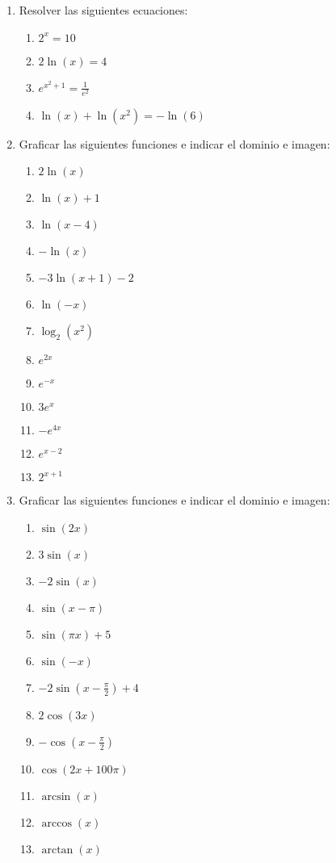 \documentclass[a4paper]{article}
\newcommand{\exercise}{\item}
\begin{document}
\begin{enumerate}
	\exercise Resolver las siguientes ecuaciones:
	\begin{enumerate} [label=(\alph*)]
		\item $2^x=10$
		\item $2\ln(x)=4$
		\item $e^{x^2+1}=\displaystyle{\frac{1}{e^2}}$
		\item $\ln(x)+\ln(x^2)=-\ln(6)$
	\end{enumerate}

	\exercise Graficar las siguientes funciones e indicar el dominio e imagen:
	\begin{multicols}{3}
	\begin{enumerate} [label=(\alph*)]
		\item $2\ln(x)$
		\item $\ln(x)+1$
		\item $\ln(x-4)$
		\item $-\ln(x)$
		\item $-3\ln(x+1)-2$
		\item $\ln(-x)$
		\item $\log_2(x^2)$
		\item $e^{2x}$
		\item $e^{-x}$
		\item $3e^{x}$
		\item $-e^{4x}$
		\item $e^{x-2}$
		\item $2^{x+1}$
	\end{enumerate}
	\end{multicols}

	\exercise Graficar las siguientes funciones e indicar el dominio e imagen:
	\begin{multicols}{3}
	\begin{enumerate} [label=(\alph*)]
		\item $\sin(2x)$
		\item $3\sin(x)$
		\item $-2\sin(x)$
		\item $\sin(x-\pi)$
		\item $\sin(\pi x)+5$
		\item $\sin(-x)$
		\item $-2\sin\left(x-\frac{\pi}{2}\right)+4$
		\item $2\cos(3x)$
		\item $-\cos\left(x-\frac{\pi}{2}\right)$
		\item $\cos(2x+100\pi)$
		\item $\arcsin(x)$
		\item $\arccos(x)$
		\item $\arctan(x)$
	\end{enumerate}
	\end{multicols}


\end{enumerate}
\end{document}
